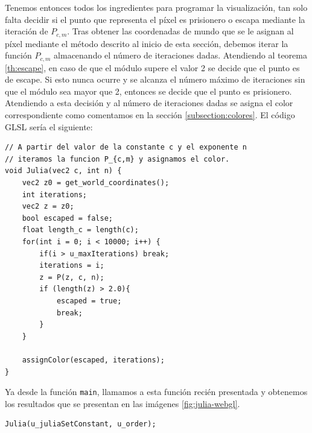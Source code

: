 Tenemos entonces todos los ingredientes para programar la visualización, tan solo falta decidir si el punto que representa el píxel es prisionero o escapa mediante la iteración de $P_{c,m}$. Tras obtener las coordenadas de mundo que se le asignan al píxel mediante el método descrito al inicio de esta sección, debemos iterar la función $P_{c,m}$ almacenando el número de iteraciones dadas. Atendiendo al teorema \ref{th:escape}, en caso de que el módulo supere el valor 2 se decide que el punto es de escape. Si esto nunca ocurre y se alcanza el número máximo de iteraciones sin que el módulo sea mayor que 2, entonces se decide que el punto es prisionero. Atendiendo a esta decisión y al número de iteraciones dadas se asigna el color correspondiente como comentamos en la sección \ref{subsection:colores}. El código GLSL sería el siguiente:

\begin{lstlisting}
// A partir del valor de la constante c y el exponente n
// iteramos la funcion P_{c,m} y asignamos el color.
void Julia(vec2 c, int n) {
    vec2 z0 = get_world_coordinates();
    int iterations;
    vec2 z = z0;
    bool escaped = false;
    float length_c = length(c);
    for(int i = 0; i < 10000; i++) {
        if(i > u_maxIterations) break;
        iterations = i;
        z = P(z, c, n);
        if (length(z) > 2.0){
            escaped = true;
            break;
        }
    }

    assignColor(escaped, iterations);
}
\end{lstlisting}

Ya desde la función \verb|main|, llamamos a esta función recién presentada y obtenemos los resultados que se presentan en las imágenes \ref{fig:julia-webgl}.  

\begin{lstlisting}
Julia(u_juliaSetConstant, u_order);
\end{lstlisting}

